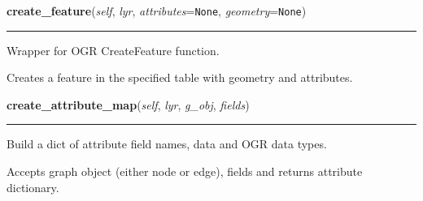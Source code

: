     \label{nx_pgnet:write:create_feature}

    \vspace{0.5ex}

\hspace{.8\funcindent}\begin{boxedminipage}{\funcwidth}

    \raggedright \textbf{create\_feature}(\textit{self}, \textit{lyr}, \textit{attributes}={\tt None}, \textit{geometry}={\tt None})

    \vspace{-1.5ex}

    \rule{\textwidth}{0.5\fboxrule}
\setlength{\parskip}{2ex}
    Wrapper for OGR CreateFeature function.

    Creates a feature in the specified table with geometry and attributes.

\setlength{\parskip}{1ex}
    \end{boxedminipage}

    \label{nx_pgnet:write:create_attribute_map}

    \vspace{0.5ex}

\hspace{.8\funcindent}\begin{boxedminipage}{\funcwidth}

    \raggedright \textbf{create\_attribute\_map}(\textit{self}, \textit{lyr}, \textit{g\_obj}, \textit{fields})

    \vspace{-1.5ex}

    \rule{\textwidth}{0.5\fboxrule}
\setlength{\parskip}{2ex}
    Build a dict of attribute field names, data and OGR data types.

    Accepts graph object (either node or edge), fields and returns 
    attribute dictionary.

\setlength{\parskip}{1ex}
    \end{boxedminipage}

    \label{nx_pgnet:write:update_graph_table}

    \vspace{0.5ex}

